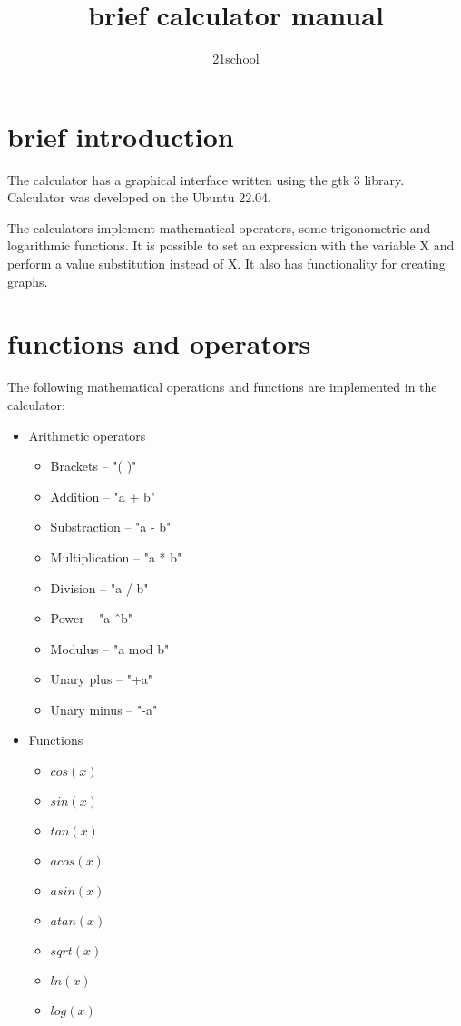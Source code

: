 \documentclass[12pt, a4paper]{article}
\title{brief calculator manual}
\author{21school}
\begin{document}
\maketitle

\pagebreak

\tableofcontents

\pagebreak

\section{brief introduction}





The calculator has a graphical interface written using the gtk 3 library.
Calculator was developed on the Ubuntu 22.04.

The calculators implement mathematical operators, some trigonometric and logarithmic functions. It is possible to set an expression with the variable X and perform a value substitution instead of X. It also has functionality for creating graphs.


\pagebreak

\section{functions and operators}

The following mathematical operations and functions are implemented in the calculator:
  \begin{itemize}
    \item Arithmetic operators
    \begin{itemize}
      \item Brackets -- "( )"
      \item Addition -- "a + b"
      \item Substraction -- "a - b"
      \item Multiplication -- "a * b"
      \item Division -- "a / b"
      \item Power -- "a \^\ b"
      \item Modulus -- "a mod b"
      \item Unary plus -- "+a"
      \item Unary minus -- "-a"
    \end{itemize}
    \item Functions
    \begin{itemize}
      \item $cos(x)$
      \item $sin(x)$
      \item $tan(x)$
      \item $acos(x)$
      \item $asin(x)$
      \item $atan(x)$
      \item $sqrt(x)$
      \item $ln(x)$
      \item $log(x)$
    \end{itemize}
  \end{itemize}
\end{document}
